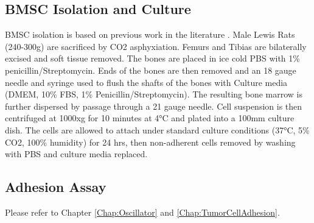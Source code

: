 \subsection{BMSC Isolation and Culture}
BMSC isolation is based on previous work in the literature \cite{Baharvand:2005mi,Tropel:2004pi}. Male Lewis Rats (240-300g) are sacrificed by CO2 asphyxiation. Femurs and Tibias are bilaterally excised and soft tissue removed.  The bones are placed in ice cold PBS with 1\% penicillin/Streptomycin.  Ends of the bones are then removed and an 18 gauge needle and syringe used to flush the shafts of the bones with Culture media (DMEM, 10\% FBS, 1\% Penicillin/Streptomycin).  The resulting bone marrow is further dispersed by passage through a 21 gauge needle.  Cell suspension is then centrifuged at 1000xg for 10 minutes at 4°C and plated into a 100mm culture dish.  The cells are allowed to attach under standard culture conditions (37°C, 5\% CO2, 100\% humidity) for 24 hrs, then non-adherent cells removed by washing with PBS and culture media replaced.

\subsection{Adhesion Assay}
Please refer to Chapter \ref{Chap:Oscillator} and \ref{Chap:TumorCellAdhesion}.





